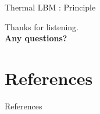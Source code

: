 \documentclass[aspectratio=43,t]{beamer}
\begin{document}
\begin{frame}{Thermal LBM : Principle}
		\begin{center}
			
		\end{center}
\end{frame}
  { %
    \begin{frame}[c,noframenumbering]
      \begin{center}
        Thanks for listening.\\
        {\bf Any questions?}
      \end{center}
    \end{frame}

    \section*{References}
    \begin{frame}[noframenumbering]{References}
      \printbibliography
    \end{frame}
  }
\end{document}
